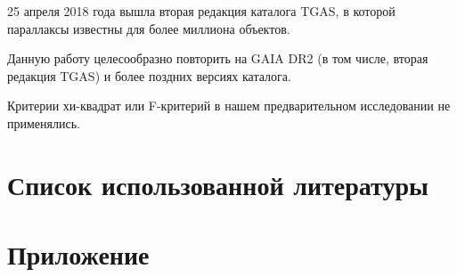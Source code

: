 \documentclass[14pt]{article} %
\begin{document}
25 апреля 2018 года вышла вторая редакция каталога TGAS, в которой параллаксы известны для более миллиона объектов.

Данную работу целесообразно повторить на GAIA DR2 (в том числе, вторая редакция TGAS) и более поздних версиях каталога.

Критерии хи-квадрат или F-критерий в нашем предварительном исследовании не применялись.

\newpage
\section{Список использованной литературы}\label{conclusionlit}
%
%
\printbibliography[type=online,title={Сайты}]
\printbibliography[type=book,title={Статьи:}]


\appendix

\section*{Приложение}
\end{document}

